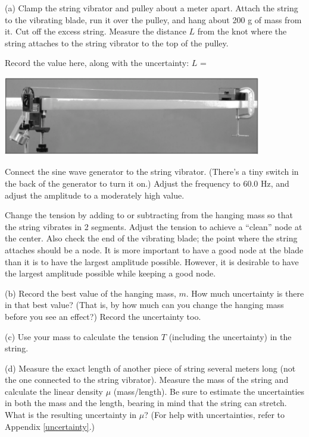 (a) Clamp the string vibrator and pulley about a meter apart. Attach the string to the vibrating blade, run it over the pulley, and hang about 200 g of mass from it. Cut off the excess string. Measure the distance $L$ from the knot where the string attaches to the string vibrator to the top of the pulley.

Record the value here, along with the uncertainty: $L$ =

\vspace{0.5cm}
\begin{center}
\includegraphics[width=320pt]{standing_waves_strings/standing_waves_strings_fig3_tb.pdf}
\end{center}

Connect the sine wave generator to the string vibrator. (There's a tiny switch in the back of the generator to turn it on.)  Adjust the frequency to 60.0 Hz, and adjust the amplitude to a moderately high value.

Change the tension by adding to or subtracting from the hanging mass so that the string vibrates in 2 segments. Adjust the tension to achieve a ``clean'' node at the center. Also check the end of the vibrating blade; the point where the string attaches should be a node. It is more important to have a good node at the blade than it is to have the largest amplitude possible. However, it is desirable to have the largest amplitude possible while keeping a good node.

(b) Record the best value of the hanging mass, $m$. How much uncertainty is there in that best value? (That is, by how much can you change the hanging mass before you see an effect?) Record the uncertainty too.
\answerspace{2cm}

\pagebreak[2]

(c) Use your mass to calculate the tension $T$ (including the uncertainty) in the string.
\answerspace{2cm}

(d) Measure the exact length of another piece of string several meters long (not the one connected to the string vibrator). Measure the mass of the
string and calculate the linear density $\mu$ (mass/length).  
Be sure to estimate the uncertainties in both the mass and the length, bearing in mind that the string can stretch. What is the resulting uncertainty in $\mu$?  (For help with uncertainties, refer to Appendix \ref{uncertainty}.)
\answerspace{4.5cm}

